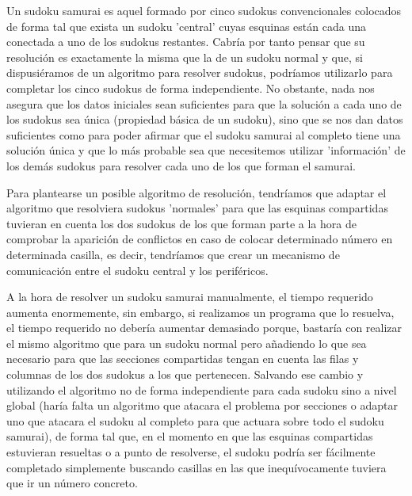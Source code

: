 \documentclass[a4paper, 11pt]{article}
\begin{document}




\pagebreak



Un sudoku samurai es aquel formado por cinco sudokus convencionales colocados de forma tal que exista un sudoku 'central' cuyas esquinas están cada una conectada a uno de los sudokus restantes. Cabría por tanto pensar que su resolución es exactamente la misma que la de un sudoku normal y que, si dispusiéramos de un algoritmo para resolver sudokus, podríamos utilizarlo para completar los cinco sudokus de forma independiente. No obstante, nada nos asegura que los datos iniciales sean suficientes para que la solución a cada uno de los sudokus sea única (propiedad básica de un sudoku), sino que se nos dan datos suficientes como para poder afirmar que el sudoku samurai al completo tiene una solución única y que lo más probable sea que necesitemos utilizar 'información' de los demás sudokus para resolver cada uno de los que forman el samurai.

Para plantearse un posible algoritmo de resolución, tendríamos que adaptar el algoritmo que resolviera sudokus 'normales' para que las esquinas compartidas tuvieran en cuenta los dos sudokus de los que forman parte a la hora de comprobar la aparición de conflictos en caso de colocar determinado número en determinada casilla, es decir, tendríamos que crear un mecanismo de comunicación entre el sudoku central y los periféricos.

A la hora de resolver un sudoku samurai manualmente, el tiempo requerido aumenta enormemente, sin embargo, si realizamos un programa que lo resuelva, el tiempo requerido no debería aumentar demasiado porque, bastaría con realizar el mismo algoritmo que para un sudoku normal pero añadiendo lo que sea necesario para que las secciones compartidas tengan en cuenta las filas y columnas de los dos sudokus a los que pertenecen. Salvando ese cambio y utilizando el algoritmo no de forma independiente para cada sudoku sino a nivel global (haría falta un algoritmo que atacara el problema por secciones o adaptar uno que atacara el sudoku al completo para que actuara sobre todo el sudoku samurai), de forma tal que, en el momento en que las esquinas compartidas estuvieran resueltas o a punto de resolverse, el sudoku podría ser fácilmente completado simplemente buscando casillas en las que inequívocamente tuviera que ir un número concreto. 
\end{document}
